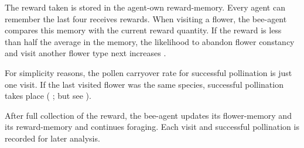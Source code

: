 The reward taken is stored in the agent-own reward-memory. Every agent can remember the last four receives rewards. When visiting a flower, the bee-agent compares this memory with the current reward quantity. If the reward is less than half the average in the memory, the likelihood to abandon flower constancy and visit another flower type next increases \citep{chittka1997foraging, keasar1996innate}. 

For simplicity reasons, the pollen carryover rate for successful pollination is just one visit. If the last visited flower was the same species, successful pollination takes place ( \citealt{campbell1986predicting}; \citealt{benadi2012population} but see \citealt{montgomery2009pollen} ).


After full collection of the reward, the bee-agent updates its flower-memory and its reward-memory and continues foraging. Each visit and successful pollination is recorded for later analysis. 




